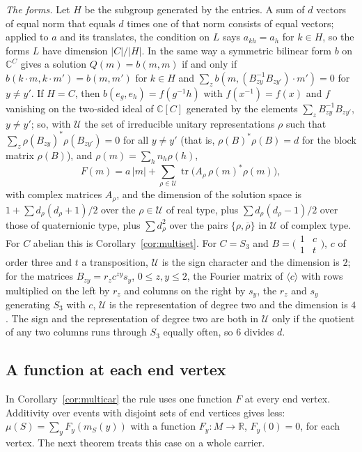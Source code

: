 \begin{remark}
\emph{The forms.} Let $H$ be the subgroup generated by the entries. A sum of $d$ vectors of equal norm that equals $d$ times one of that norm consists of equal vectors; applied to $a$ and its translates, the condition on $L$ says $a_{kh}=a_h$ for $k\in H$, so the forms $L$ have dimension $|C|/|H|$. In the same way a symmetric bilinear form $b$ on $\mathbb{C}^C$ gives a solution $Q(m)=b(m,m)$ if and only if $b(k\cdot m,k\cdot m')=b(m,m')$ for $k\in H$ and $\sum_zb(m,(B_{zy}^{-1}B_{zy'})\cdot m')=0$ for $y\ne y'$. If $H=C$, then $b(e_g,e_h)=f(g^{-1}h)$ with $f(x^{-1})=f(x)$ and $f$ vanishing on the two-sided ideal of $\mathbb{C}[C]$ generated by the elements $\sum_zB_{zy}^{-1}B_{zy'}$, $y\ne y'$; so, with $\mathcal{U}$ the set of irreducible unitary representations $\rho$ such that $\sum_z\rho(B_{zy})^*\rho(B_{zy'})=0$ for all $y\ne y'$ (that is, $\rho(B)^*\rho(B)=d$ for the block matrix $\rho(B)$), and $\rho(m)=\sum_hn_h\rho(h)$,
\[
F(m)=a\,|m|+\sum_{\rho\in\mathcal{U}}\operatorname{tr}\bigl(A_\rho\,\rho(m)^*\rho(m)\bigr),
\]
with complex matrices $A_\rho$, and the dimension of the solution space is $1+\sum d_\rho(d_\rho+1)/2$ over the $\rho\in\mathcal{U}$ of real type, plus $\sum d_\rho(d_\rho-1)/2$ over those of quaternionic type, plus $\sum d_\rho^2$ over the pairs $\{\rho,\overline\rho\}$ in $\mathcal{U}$ of complex type. For $C$ abelian this is Corollary~\ref{cor:multiset}. For $C=S_3$ and $B=\bigl(\begin{smallmatrix}1&c\\1&t\end{smallmatrix}\bigr)$, $c$ of order three and $t$ a transposition, $\mathcal{U}$ is the sign character and the dimension is $2$; for the matrices $B_{zy}=r_zc^{zy}s_y$, $0\le z,y\le2$, the Fourier matrix of $\langle c\rangle$ with rows multiplied on the left by $r_z$ and columns on the right by $s_y$, the $r_z$ and $s_y$ generating $S_3$ with $c$, $\mathcal{U}$ is the representation of degree two and the dimension is $4$. The sign and the representation of degree two are both in $\mathcal{U}$ only if the quotient of any two columns runs through $S_3$ equally often, so $6$ divides $d$.
\end{remark}

\subsection{A function at each end vertex}
In Corollary~\ref{cor:multicar} the rule uses one function $F$ at every end vertex. Additivity over events with disjoint sets of end vertices gives less: $\mu(S)=\sum_yF_y(m_S(y))$ with a function $F_y\colon M\to\mathbb{R}$, $F_y(0)=0$, for each vertex. The next theorem treats this case on a whole carrier.

